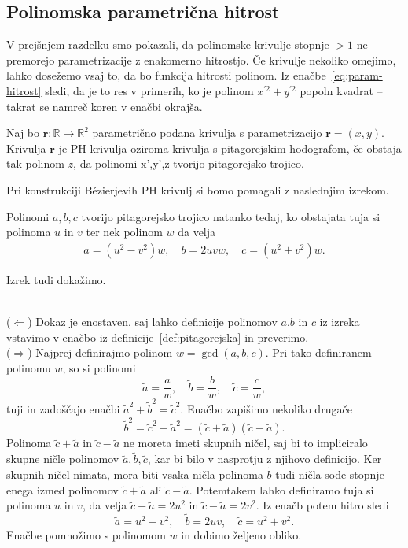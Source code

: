 \documentclass[isrm2, tisk]{fmfdelo}
\newcommand{\R}{\mathbb R}
\begin{document}
    \subsection{Polinomska parametrična hitrost}
    V prejšnjem razdelku smo pokazali, da polinomske krivulje stopnje $>1$ ne premorejo parametrizacije z enakomerno hitrostjo.
    Če krivulje nekoliko omejimo, lahko dosežemo vsaj to, da bo funkcija hitrosti polinom.
    Iz enačbe~\eqref{eq:param-hitrost} sledi, da je to res v primerih, ko je polinom $x^{'2}+y^{'2}$ popoln kvadrat – takrat se namreč koren v enačbi okrajša.
    \begin{definicija}
        Naj bo $\mathbf{r}:\R\to\R^2$ parametrično podana krivulja s parametrizacijo $\mathbf{r}=(x,y)$.
        Krivulja $\mathbf{r}$ je PH krivulja oziroma krivulja s pitagorejskim hodografom, če obstaja tak polinom $z$, da polinomi x',y',z tvorijo pitagorejsko trojico.
    \end{definicija}
    \noindent Pri konstrukciji Bézierjevih PH krivulj si bomo pomagali z naslednjim izrekom.
    \begin{izrek}
        \label{izrek:pitagorejske}         %
        Polinomi $a,b,c$ tvorijo pitagorejsko trojico natanko tedaj, ko obstajata tuja si polinoma $u$ in $v$ ter nek polinom  $w$ da velja
        \begin{align*}
            a=(u^2-v^2)w,\quad b=2uvw,\quad c=(u^2+v^2)w.
        \end{align*}
    \end{izrek}
    \noindent Izrek tudi dokažimo.
    \begin{dokaz}
        \mbox{}\\
        ($\Leftarrow$) Dokaz je enostaven, saj lahko definicije polinomov $a$,$b$ in $c$ iz izreka vstavimo v enačbo iz definicije~\ref{def:pitagorejska} in preverimo. \\
        ($\Rightarrow$) Najprej definirajmo polinom $w=\gcd(a,b,c)$.
        Pri tako definiranem polinomu $w$, so si polinomi \[\tilde{a}=\frac{a}{w},\quad \tilde{b}=\frac{b}{w},\quad \tilde{c}=\frac{c}{w},\] tuji in zadoščajo enačbi $\tilde{a}^2+\tilde{b}^2=\tilde{c}^2$.
        Enačbo zapišimo nekoliko drugače \[\tilde{b}^2= \tilde{c}^2-\tilde{a}^2 = (\tilde{c}+\tilde{a})(\tilde{c}-\tilde{a}).\]
        Polinoma $\tilde{c}+\tilde{a}$ in $\tilde{c}-\tilde{a}$ ne moreta imeti skupnih ničel, saj bi to impliciralo skupne ničle polinomov $\tilde{a},\tilde{b},\tilde{c}$, kar bi bilo v nasprotju z njihovo definicijo.
        Ker skupnih ničel nimata, mora biti vsaka ničla polinoma $\tilde{b}$ tudi ničla sode stopnje enega izmed polinomov $\tilde{c}+\tilde{a}$ ali $\tilde{c}-\tilde{a}$.
        Potemtakem lahko definiramo tuja si polinoma $u$ in $v$, da velja $\tilde{c}+\tilde{a}=2u^2$ in $\tilde{c}-\tilde{a}=2v^2$.
        Iz enačb potem hitro sledi \[\tilde{a}=u^2-v^2,\quad\tilde{b}=2uv, \quad\tilde{c}=u^2+v^2.\]
        Enačbe pomnožimo s polinomom $w$ in dobimo željeno obliko. \qedhere
    \end{dokaz}
\end{document}
